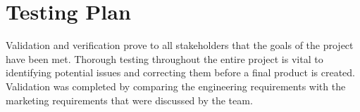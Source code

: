 \newcommand{\testheader}{\textrotate{\textbf{Step}} & \textbf{Action} & \textbf{Expected Result} & \textrotate{\textbf{Pass}} & \textrotate{\textbf{Fail}} & \textrotate{\textbf{N/A}} & \textbf{Comments} \\ \hline}
\newcommand{\testinfo}[2]{\multicolumn{2}{|r|}{\textbf{Test Case Name:}} & \multicolumn{5}{m{11cm}|}{#1} \\ \hline \multicolumn{2}{|r|}{\textbf{Description:}} & \multicolumn{5}{m{11cm}|}{#2} \\ \hline}
\newcommand{\testerinfo}{\multicolumn{2}{|r|}{\textbf{Name of Tester:}} & & \multicolumn{3}{l|}{\textbf{Date:}} & \\ \hline \multicolumn{2}{|r|}{\textbf{HW/SW Version:}} & & \multicolumn{3}{l|}{\textbf{Time:}} & \\ \hline}
\newcommand{\testsetup}[1]{\multicolumn{2}{|r|}{\textbf{Setup:}} & \multicolumn{5}{m{11cm}|}{#1} \\ \hline}
\newcommand{\testtabular}[3]{\begin{tabular}{|m{.25cm}|m{4cm}|m{5cm}|m{.25cm}|m{.25cm}|m{.25cm}|m{3cm}|}\hline\testinfo{#1}{#2}\testerinfo\testsetup{#3}\testheader}

\chapter{Testing Plan}
Validation and verification prove to all stakeholders that the goals of the project have been met.
Thorough testing throughout the entire project is vital to identifying potential issues and correcting them before a final product is created. 
Validation was completed by comparing the engineering requirements with the marketing requirements that were discussed by the team. 

